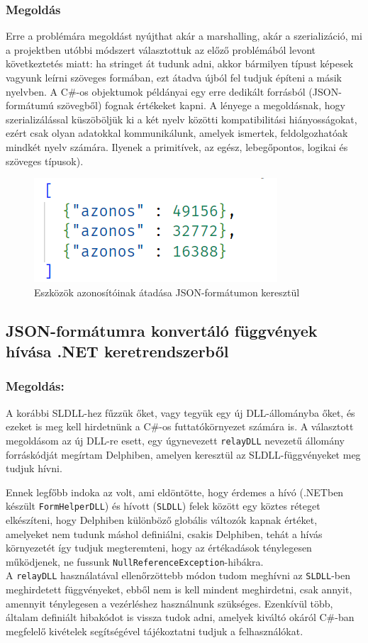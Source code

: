 \documentclass[tocnopagenum]{thesis-ekf}
\theoremstyle{definition}
\theoremstyle{remark}
\begin{document}
	\subsubsection{Megoldás} 
	Erre a problémára megoldást nyújthat akár a marshalling, akár a szerializáció, mi a projektben utóbbi módszert választottuk az előző problémából levont következtetés miatt: ha stringet át tudunk adni, akkor bármilyen típust képesek vagyunk leírni szöveges formában, ezt átadva újból fel tudjuk építeni a másik nyelvben. A C\#-os objektumok példányai egy erre dedikált forrásból (JSON-formátumú szövegből) fognak értékeket kapni.
	A lényege a megoldásnak, hogy szerializálással küszöböljük ki a két nyelv közötti kompatibilitási hiányosságokat, ezért csak olyan adatokkal kommunikálunk, amelyek ismertek, feldolgozhatóak mindkét nyelv számára. Ilyenek a primitívek, az egész, lebegőpontos, logikai és szöveges típusok).
	\begin{figure}[h!]
		\centering
		\includegraphics[scale=0.75]{json_szerializalas_azonositok}
		\caption{Eszközök azonosítóinak átadása JSON-formátumon keresztül}
		\label{json_azonositok}
	\end{figure}
	\subsection{JSON-formátumra konvertáló függvények hívása .NET keretrendszerből}
	\subsubsection{Megoldás:} A korábbi SLDLL-hez fűzzük őket, vagy tegyük egy új DLL-állományba őket, és ezeket is meg kell hirdetnünk a C\#-os futtatókörnyezet számára is. A választott megoldásom az új DLL-re esett, egy úgynevezett \verb*|relayDLL| nevezetű állomány forráskódját megírtam Delphiben, amelyen keresztül az SLDLL-függvényeket meg tudjuk hívni.
	
	Ennek legfőbb indoka az volt, ami eldöntötte, hogy érdemes a hívó (.NETben készült \verb*|FormHelperDLL|) és hívott (\verb*|SLDLL|) felek között egy köztes réteget elkészíteni, hogy Delphiben különböző globális változók kapnak értéket, amelyeket nem tudunk máshol definiálni, csakis Delphiben, tehát a hívás környezetét így tudjuk megteremteni, hogy az értékadások ténylegesen működjenek, ne fussunk \verb*|NullReferenceException|-hibákra.\\
	A \verb*|relayDLL| használatával ellenőrzöttebb módon tudom meghívni az \verb*|SLDLL|-ben meghirdetett függvényeket, ebből nem is kell mindent meghirdetni, csak annyit, amennyit ténylegesen a vezérléshez használnunk szükséges. Ezenkívül több, általam definiált hibakódot is vissza tudok adni, amelyek kiváltó okáról C\#-ban megfelelő kivételek segítségével tájékoztatni tudjuk a felhasználókat.
\end{document}
